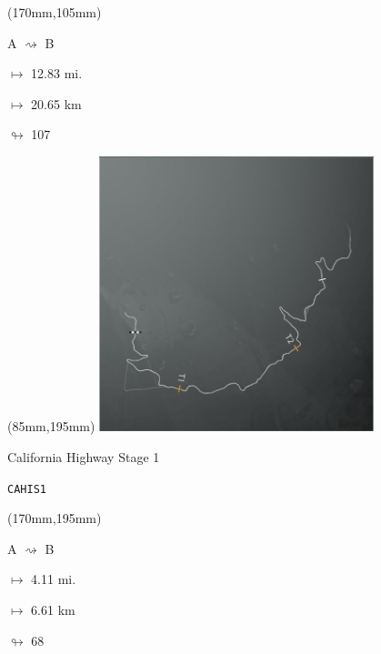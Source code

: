 \begin{textblock*}{30mm}(170mm,105mm)%
\par A $\rightsquigarrow$ B
\Large
\par$\mapsto$ 12.83 mi.
\par$\mapsto$ 20.65 km
\par$\looparrowright$ 107
\end{textblock*}
\begin{textblock*}{80mm}(85mm,195mm)%
\includegraphics[width=80mm]{TR/2015-05-20_00014.png}
\centerline{California Highway Stage 1}
\par\hfill\tiny\tt CAHIS1\\
\end{textblock*}
\begin{textblock*}{30mm}(170mm,195mm)%
\par A $\rightsquigarrow$ B
\Large
\par$\mapsto$ 4.11 mi.
\par$\mapsto$ 6.61 km
\par$\looparrowright$ 68
\end{textblock*}
\null\newpage

